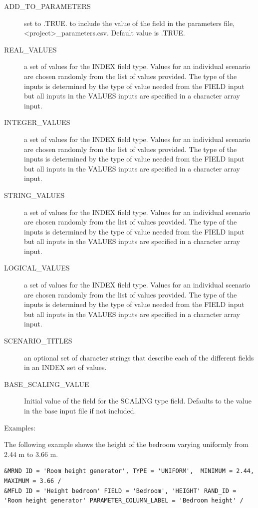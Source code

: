 \documentclass[12pt,twoside]{book}
\begin{document}
\begin{description}
  \item[ADD\_TO\_PARAMETERS] set to .TRUE. to include the value of the field in the parameters file, {\ct <project>\_parameters.csv}. Default value is .TRUE.
 \item[REAL\_VALUES] a set of values for the {\ct INDEX} field type. Values for an individual scenario are chosen randomly from the list of values provided. The type of the inputs is determined by the type of value needed from the {\ct FIELD} input but all inputs in the {\ct VALUES} inputs are specified in a character array input.
  \item[INTEGER\_VALUES] a set of values for the {\ct INDEX} field type. Values for an individual scenario are chosen randomly from the list of values provided. The type of the inputs is determined by the type of value needed from the {\ct FIELD} input but all inputs in the {\ct VALUES} inputs are specified in a character array input.
  \item[STRING\_VALUES] a set of values for the {\ct INDEX} field type. Values for an individual scenario are chosen randomly from the list of values provided. The type of the inputs is determined by the type of value needed from the {\ct FIELD} input but all inputs in the {\ct VALUES} inputs are specified in a character array input.
  \item[LOGICAL\_VALUES] a set of values for the {\ct INDEX} field type. Values for an individual scenario are chosen randomly from the list of values provided. The type of the inputs is determined by the type of value needed from the {\ct FIELD} input but all inputs in the {\ct VALUES} inputs are specified in a character array input.
  \item[SCENARIO\_TITLES] an optional set of character strings that describe each of the different fields in an {\ct INDEX} set of values.
  \item[BASE\_SCALING\_VALUE] Initial value of the field for the {\ct SCALING} type field. Defaults to the value in the base input file if not included.
\end{description}

\vspace{\baselineskip}
\noindent Examples:

The following example shows the height of the bedroom varying uniformly from 2.44 m to 3.66 m.
\begin{lstlisting}[language=cdata, basicstyle=\scriptsize]
&MRND ID = 'Room height generator', TYPE = 'UNIFORM',  MINIMUM = 2.44, MAXIMUM = 3.66 /
&MFLD ID = 'Height bedroom' FIELD = 'Bedroom', 'HEIGHT' RAND_ID = 'Room height generator' PARAMETER_COLUMN_LABEL = 'Bedroom height' /
\end{lstlisting}
\end{document}
